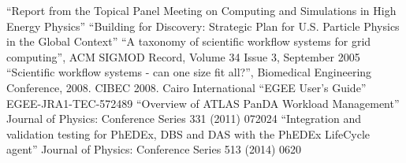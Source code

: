\begin{thebibliography}{99}
 ``Report from the Topical Panel Meeting on Computing and
Simulations in High Energy Physics''
 ``Building for Discovery: Strategic Plan for U.S. Particle Physics in the Global Context''
 ``A taxonomy of scientific workflow systems for grid computing'', ACM SIGMOD Record, Volume 34 Issue 3, September 2005
 ``Scientific workflow systems - can one size fit all?'', Biomedical Engineering Conference, 2008. CIBEC 2008. Cairo International
 ``EGEE User’s Guide'' EGEE-JRA1-TEC-572489
 ``Overview of ATLAS PanDA Workload Management'' Journal of Physics: Conference Series 331 (2011) 072024
 ``Integration and validation testing for PhEDEx, DBS and DAS with the PhEDEx LifeCycle agent'' Journal of Physics: Conference Series 513 (2014) 0620
\end{thebibliography}
